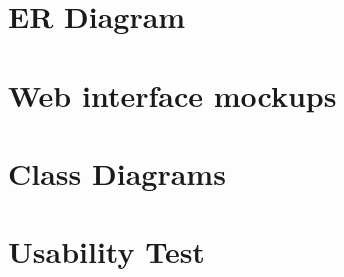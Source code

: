 	\section{ER Diagram}
	\label{errDiagram}
		
	\section{Web interface mockups}
		
		\label{app:Mock}
	\section{Class Diagrams}
	\label{app:Class-diagrams}
		
        
   \section{Usability Test}
   	
   		\label{app:quest}



\appendix


